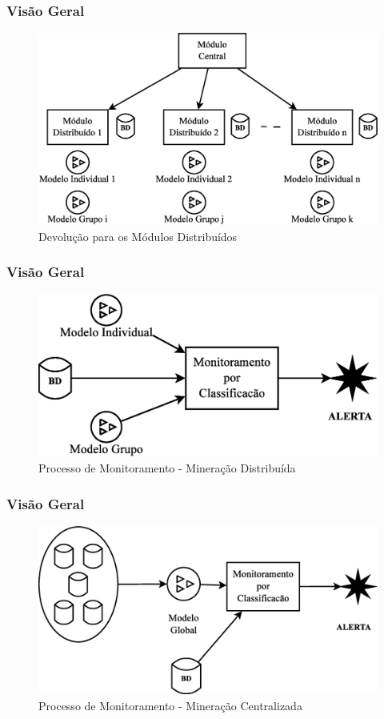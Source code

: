 \documentclass[hyperref={pdfpagelabels=false}]{beamer}
\begin{document}
\begin{frame}
	\frametitle{Visão Geral}
    \begin{figure}
		\centering
	    \includegraphics[scale=0.30]{img/VisaoGeral-04}
  		\caption{\scriptsize{Devolução para os Módulos Distribuídos}}
   	\end{figure}
\end{frame}

\begin{frame}
	\frametitle{Visão Geral}
    \begin{figure}
		\centering
	    \includegraphics[scale=0.30]{img/VisaoGeral-05}
  		\caption{\scriptsize{Processo de Monitoramento - Mineração Distribuída}}
   	\end{figure}
\end{frame}

\begin{frame}
	\frametitle{Visão Geral}
    \begin{figure}
		\centering
	    \includegraphics[scale=0.30]{img/VisaoGeral-06}
  		\caption{\scriptsize{Processo de Monitoramento - Mineração Centralizada}}
   	\end{figure}
\end{frame}
\end{document}
